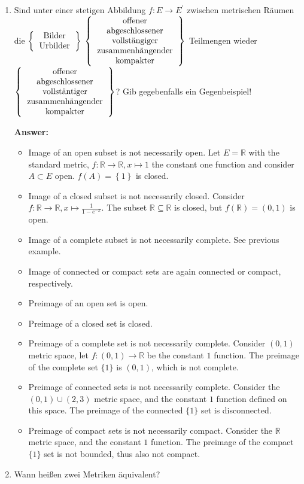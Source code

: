 \documentclass[11pt]{article}
\newcommand{\RR}[0]{\mathbb{R}}
\begin{document}
\begin{enumerate}
    \item Sind unter einer stetigen Abbildung $f: E \to E^\prime$ zwischen metrischen Räumen die $\left\{\begin{tabular}{c}
        \text{Bilder}\\
        \text{Urbilder}
    \end{tabular}\right\}$ $\left\{\begin{tabular}{c}
    \text{offener}\\
    \text{abgeschlossener}\\
    \text{vollstängiger}\\
    \text{zusammenhängender}\\
    \text{kompakter}
    \end{tabular}\right\}$ Teilmengen wieder $\left\{\begin{tabular}{c}
        \text{offener}\\
        \text{abgeschlossener}\\
        \text{vollstäntiger}\\
        \text{zusammenhängender}\\
        \text{kompakter}
        \end{tabular}\right\}$?
    Gib gegebenfalls ein Gegenbeispiel!

    \textbf{Answer:}
    \begin{itemize}
        \item Image of an open subset is not necessarily open. Let $E = \RR$ with the standard metric, $f\colon \RR \to \RR, x \mapsto 1$ the constant one function and consider $A \subset E$ open. $f(A) = \left\{1\right\}$ is closed.
        \item Image of a closed subset is not necessarily closed. Consider $f\colon \RR \to \RR, x \mapsto \frac{1}{1-e^{-x}}$. The subset $\RR \subseteq \RR$ is closed, but $f(\RR) = (0, 1)$ is open.
        \item Image of a complete subset is not necessarily complete. See previous example.
        \item Image of connected or compact sets are again connected or compact, respectively.
        \item Preimage of an open set is open.
        \item Preimage of a closed set is closed.
        \item Preimage of a complete set is not necessarily complete. Consider $(0, 1)$ metric space, let $f\colon (0, 1) \to \RR$ be the constant $1$ function. The preimage of the complete set $\{1\}$ is $(0, 1)$, which is not complete.
        \item Preimage of connected sets is not necessarily complete. Consider the $(0, 1) \cup (2, 3)$ metric space, and the constant $1$ function defined on this space. The preimage of the connected $\{1\}$ set is disconnected.
        \item Preimage of compact sets is not necessarily compact. Consider the $\RR$ metric space, and the constant $1$ function. The preimage of the compact $\{1\}$ set is not bounded, thus also not compact.
    \end{itemize}
    \item Wann heißen zwei Metriken äquivalent?


\end{enumerate}
\end{document}
